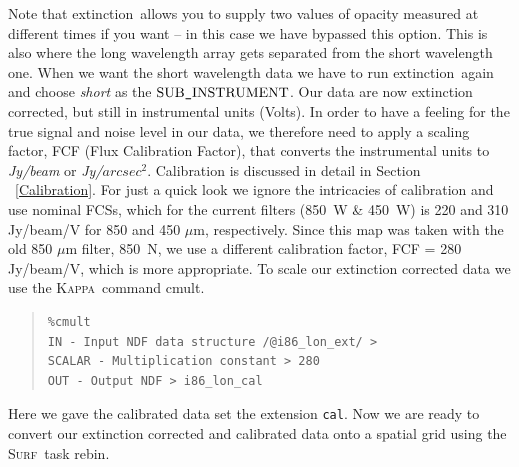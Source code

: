 \documentclass[twoside,11pt]{article}
\newenvironment{myquote}{\begin{quote}\begin{small}}{\end{small}\end{quote}}
\newcommand{\Kappa}{\xref{\textsc{Kappa}}{sun95}{}}
\newcommand{\surf}{\xref{\textsc{Surf}}{sun216}{}}
\newcommand{\task}[1]{\textsf{#1}}
\newcommand{\rebin}{\xref{\task{rebin}}{sun216}{REBIN}}
\newcommand{\ext}{\xref{\task{extinction}}{sun216}{EXTINCTION}}
\newcommand{\cmult}{\xref{\task{cmult}}{sun95}{CMULT}}
\newcommand{\xref}[3]{#1}
\renewcommand{\_}{\texttt{\symbol{95}}}
\begin{document}
Note that \ext\ allows you to supply two values of opacity measured at
different times if you want -- in this case we have bypassed this
option.  This is also where the long wavelength array gets separated
from the short wavelength one.  When we want the short wavelength data
we have to run \ext\ again and choose {\it short} as the $\rm
SUB\_INSTRUMENT$.  Our data are now extinction corrected, but still in
instrumental units (Volts).  In order to have a feeling for the true
signal and noise level in our data, we therefore need to apply a
scaling factor, FCF (Flux Calibration Factor), that converts the
instrumental units to {\it Jy/beam} or {\it Jy/$arcsec^2$}.
Calibration is discussed in detail in Section \ \ref{Calibration}.
For just a quick look we ignore the intricacies of calibration and use
nominal FCSs, which for the current filters (850~W \& 450~W) is 220
and 310 Jy/beam/V for 850 and 450 $\mu$m, respectively.  Since this
map was taken with the old 850 $\mu$m filter, 850~N, we use a
different calibration factor, FCF = 280 Jy/beam/V, which is more
appropriate.  To scale our extinction corrected data we use the
\Kappa\ command \cmult.



\begin{myquote}
\begin{verbatim}
%cmult
IN - Input NDF data structure /@i86_lon_ext/ >
SCALAR - Multiplication constant > 280
OUT - Output NDF > i86_lon_cal
\end{verbatim}
\end{myquote}

Here we gave the calibrated data set the extension \texttt{\_cal}.
Now we are ready to convert our extinction corrected and calibrated
data onto a spatial grid using the \surf\ task \rebin.
\end{document}
